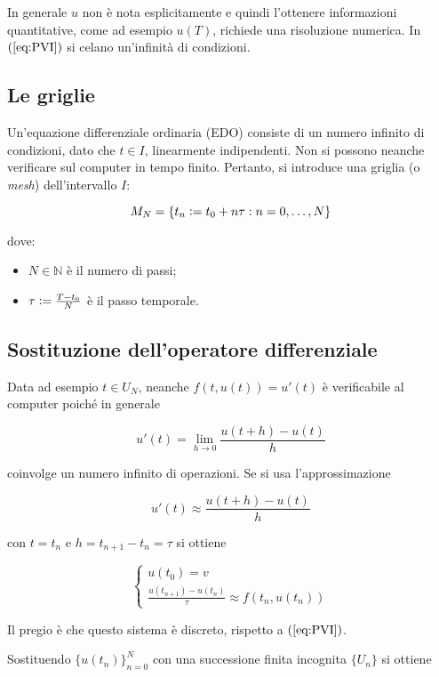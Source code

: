 \documentclass[hidelinks, 10pt]{report}
\begin{document}
In generale $ u $ non \`e nota esplicitamente e quindi l'ottenere informazioni quantitative, come ad esempio $ u(T) $, richiede una risoluzione numerica. In $ (\ref{eq:PVI}) $ si celano un'infinit\`a di condizioni.

\subsection{Le griglie}
Un'equazione differenziale ordinaria (EDO) consiste di un numero infinito di condizioni, dato che $ t \in I $, linearmente indipendenti. Non si possono neanche verificare sul computer in tempo finito. Pertanto, si introduce una griglia (o \emph{mesh}) dell'intervallo $ I $:

\[ M_{N} = \{ t_{n} \vcentcolon= t_{0} + n \tau : n = 0, \dotsc, N \} \]

dove:
\begin{itemize}
\item $ N \in \mathbb{N} $ \`e il numero di passi;
\item $ \tau \vcentcolon= \frac{T - t_{0}}{N} $ \`e il passo temporale.
\end{itemize}


\subsection{Sostituzione dell'operatore differenziale}
Data ad esempio $ t \in U_{N} $, neanche $ f \left( t, u(t) \right) = u'(t) $ \`e verificabile al computer poich\'e in generale

\[ u'(t) = \lim\limits_{h \to 0} \frac{u(t + h) - u(t)}{h} \]

coinvolge un numero infinito di operazioni. Se si usa l'approssimazione

\[ u'(t) \approx \frac{u(t + h) - u(t)}{h} \]

con $ t = t_{n} $ e $ h = t_{n + 1} - t_{n} = \tau $ si ottiene

\[
\begin{cases}
u(t_{0}) = v \\
\frac{u(t_{n + 1}) - u(t_{n})}{\tau} \approx f \left( t_{n}, u(t_{n}) \right)
\end{cases}
\]

Il pregio \`e che questo sistema \`e discreto, rispetto a $ (\ref{eq:PVI}) $.

Sostituendo $ \{ u(t_{n}) \}_{n = 0}^{N} $ con una successione finita incognita $ \{ U_{n} \} $ si ottiene
\end{document}
